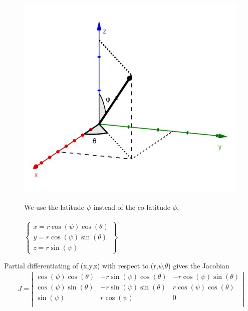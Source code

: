 \begin{figure}[h]
\centering
\begin{minipage}[t]{.5\textwidth}
\vspace{0pt}
\includegraphics[scale=.5]{spherical.jpg}
\end{minipage}\hfill
\begin{minipage}[t]{0.4\textwidth}
\vspace{50pt}
We use the latitude $\psi$ instead of the co-latitude $\phi$.\\\\
$\left\{ \begin{array}{c}
    x= r\cos (\psi )\cos (\theta) \\
     y= r\cos (\psi )\sin (\theta) \\
      z= r\sin(\psi )
  \end{array} \right\}$
\end{minipage}
\end{figure}
Partial differentiating of (x,y,z) with respect to (r,$\psi$,$\theta$) gives the Jacobian
\begin{align}
\ J=
\left| {\begin{array}{ccc}
    \cos (\psi )\cos (\theta) & -r\sin (\psi )\cos (\theta) & -r\cos (\psi )\sin (\theta)\\
    \cos (\psi )\sin (\theta) & -r\sin (\psi )\sin (\theta) & r\cos (\psi )\cos (\theta)\\
    \sin (\psi ) & r\cos (\psi )& 0\\
  \end{array} } \right|
\end{align}



